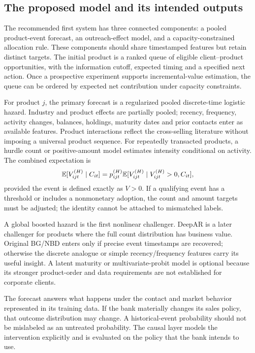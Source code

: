 \subsection{The proposed model and its intended outputs}

The recommended first system has three connected components: a pooled product-event forecast, an outreach-effect model, and a capacity-constrained allocation rule. These components should share timestamped features but retain distinct targets. The initial product is a ranked queue of eligible client--product opportunities, with the information cutoff, expected timing and a specified next action. Once a prospective experiment supports incremental-value estimation, the queue can be ordered by expected net contribution under capacity constraints.

For product $j$, the primary forecast is a regularized pooled discrete-time logistic hazard. Industry and product effects are partially pooled; recency, frequency, activity changes, balances, holdings, maturity dates and prior contacts enter as available features. Product interactions reflect the cross-selling literature without imposing a universal product sequence. For repeatedly transacted products, a hurdle count or positive-amount model estimates intensity conditional on activity. The combined expectation is
\begin{equation}
 \mathbb{E}[V_{ijt}^{(H)}\mid C_{it}]
 =p_{ijt}^{(H)}\mathbb{E}[V_{ijt}^{(H)}\mid V_{ijt}^{(H)}>0,C_{it}],
 \label{eq:hurdle-value}
\end{equation}
provided the event is defined exactly as $V>0$. If a qualifying event has a threshold or includes a nonmonetary adoption, the count and amount targets must be adjusted; the identity cannot be attached to mismatched labels.

A global boosted hazard is the first nonlinear challenger. DeepAR is a later challenger for products where the full count distribution has business value. Original BG/NBD enters only if precise event timestamps are recovered; otherwise the discrete analogue or simple recency/frequency features carry its useful insight. A latent maturity or multivariate-probit model is optional because its stronger product-order and data requirements are not established for corporate clients.

The forecast answers what happens under the contact and market behavior represented in its training data. If the bank materially changes its sales policy, that outcome distribution may change. A historical-event probability should not be mislabeled as an untreated probability. The causal layer models the intervention explicitly and is evaluated on the policy that the bank intends to use.

